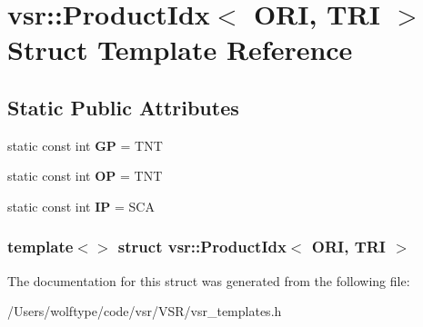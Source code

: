 \hypertarget{structvsr_1_1_product_idx_3_01_o_r_i_00_01_t_r_i_01_4}{\section{vsr\-:\-:Product\-Idx$<$ O\-R\-I, T\-R\-I $>$ Struct Template Reference}
\label{structvsr_1_1_product_idx_3_01_o_r_i_00_01_t_r_i_01_4}
}
\subsection*{Static Public Attributes}
\begin{DoxyCompactItemize}
\item 
\hypertarget{structvsr_1_1_product_idx_3_01_o_r_i_00_01_t_r_i_01_4_a0cfd91d95918d7c965bc1f03fe74e599}{static const int {\bfseries G\-P} = T\-N\-T}\label{structvsr_1_1_product_idx_3_01_o_r_i_00_01_t_r_i_01_4_a0cfd91d95918d7c965bc1f03fe74e599}

\item 
\hypertarget{structvsr_1_1_product_idx_3_01_o_r_i_00_01_t_r_i_01_4_a86ae706a7cf507f53e54b9c8a56a0bff}{static const int {\bfseries O\-P} = T\-N\-T}\label{structvsr_1_1_product_idx_3_01_o_r_i_00_01_t_r_i_01_4_a86ae706a7cf507f53e54b9c8a56a0bff}

\item 
\hypertarget{structvsr_1_1_product_idx_3_01_o_r_i_00_01_t_r_i_01_4_a3ad5e70a3eb53ca3d9c627e53cd5e3b1}{static const int {\bfseries I\-P} = S\-C\-A}\label{structvsr_1_1_product_idx_3_01_o_r_i_00_01_t_r_i_01_4_a3ad5e70a3eb53ca3d9c627e53cd5e3b1}

\end{DoxyCompactItemize}
\subsubsection*{template$<$$>$ struct vsr\-::\-Product\-Idx$<$ O\-R\-I, T\-R\-I $>$}



The documentation for this struct was generated from the following file\-:\begin{DoxyCompactItemize}
\item 
/\-Users/wolftype/code/vsr/\-V\-S\-R/vsr\-\_\-templates.\-h\end{DoxyCompactItemize}

